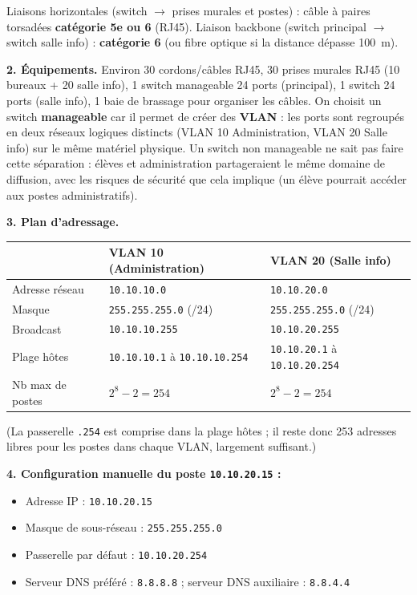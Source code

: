 \documentclass[11pt]{article}
\begin{document}
\begin{corrige}
Liaisons horizontales (switch $\rightarrow$ prises murales et postes) : câble à paires torsadées \textbf{catégorie 5e ou 6} (RJ45). Liaison backbone (switch principal $\rightarrow$ switch salle info) : \textbf{catégorie 6} (ou fibre optique si la distance dépasse \SI{100}{m}).

\textbf{2. Équipements.} Environ 30 cordons/câbles RJ45, 30 prises murales RJ45 (10 bureaux + 20 salle info), 1 switch manageable 24 ports (principal), 1 switch 24 ports (salle info), 1 baie de brassage pour organiser les câbles. On choisit un switch \textbf{manageable} car il permet de créer des \textbf{VLAN} : les ports sont regroupés en deux réseaux logiques distincts (VLAN 10 Administration, VLAN 20 Salle info) sur le même matériel physique. Un switch non manageable ne sait pas faire cette séparation : élèves et administration partageraient le même domaine de diffusion, avec les risques de sécurité que cela implique (un élève pourrait accéder aux postes administratifs).

\textbf{3. Plan d'adressage.}

\begin{center}
\begin{tabularx}{\linewidth}{|l|X|X|}
\hline
\rowcolor{popblueL}
 & \textbf{VLAN 10 (Administration)} & \textbf{VLAN 20 (Salle info)} \\
\hline
Adresse réseau & \texttt{10.10.10.0} & \texttt{10.10.20.0} \\
\hline
Masque & \texttt{255.255.255.0} (/24) & \texttt{255.255.255.0} (/24) \\
\hline
Broadcast & \texttt{10.10.10.255} & \texttt{10.10.20.255} \\
\hline
Plage hôtes & \texttt{10.10.10.1} à \texttt{10.10.10.254} & \texttt{10.10.20.1} à \texttt{10.10.20.254} \\
\hline
Nb max de postes & $2^8 - 2 = 254$ & $2^8 - 2 = 254$ \\
\hline
\end{tabularx}
\end{center}

(La passerelle \texttt{.254} est comprise dans la plage hôtes ; il reste donc 253 adresses libres pour les postes dans chaque VLAN, largement suffisant.)

\textbf{4. Configuration manuelle du poste \texttt{10.10.20.15} :}
\begin{itemize}
    \item Adresse IP : \texttt{10.10.20.15}
    \item Masque de sous-réseau : \texttt{255.255.255.0}
    \item Passerelle par défaut : \texttt{10.10.20.254}
    \item Serveur DNS préféré : \texttt{8.8.8.8} ; serveur DNS auxiliaire : \texttt{8.8.4.4}
\end{itemize}


\end{corrige}
\end{document}
